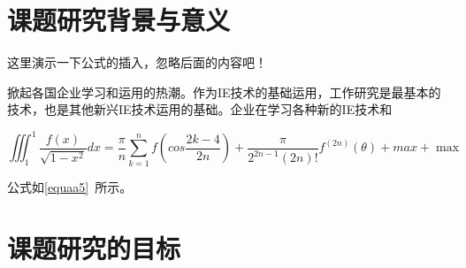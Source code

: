 \chapter{课题研究背景与意义}
这里演示一下公式的插入，忽略后面的内容吧！

掀起各国企业学习和运用的热潮。作为IE技术的基础运用，工作研究是最基本的技术，也是其他新兴IE技术运用的基础。企业在学习各种新的IE技术和\cite{huwei}

\begin{equation}
\label{equaa5}
\iiint_1^1\frac{f(x)}{\sqrt{1-x^2}}dx = \frac{\pi}{n}\sum_{k=1}^nf(cos\frac{2k-4}{2n})+\frac{\pi}{2^{2n-1}(2n)!}f^{(2n)}(\theta)+max+\max
\end{equation}

公式如\eqref{equaa5}~所示。

\chapter{课题研究的目标}
